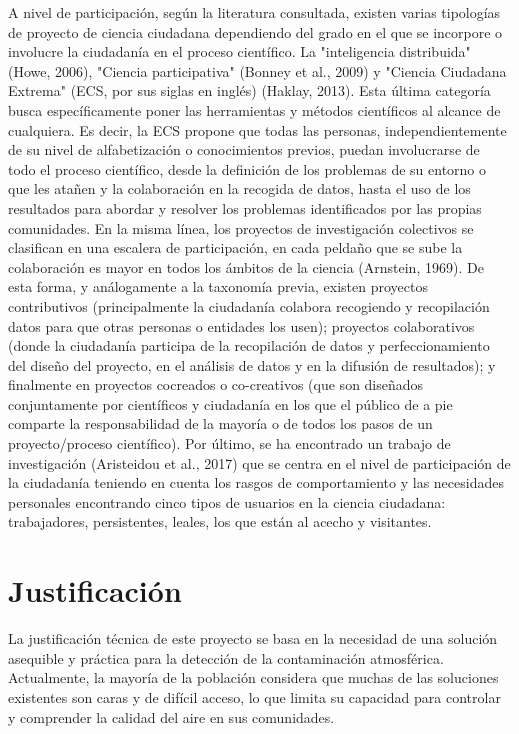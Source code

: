 A nivel de participación, según la literatura consultada, existen varias tipologías de proyecto de ciencia ciudadana dependiendo del grado en el que se incorpore o involucre la ciudadanía en el proceso científico. La "inteligencia distribuida" (Howe, 2006), "Ciencia participativa" (Bonney et al., 2009) y "Ciencia Ciudadana Extrema" (ECS, por sus siglas en inglés) (Haklay, 2013). Esta última categoría busca específicamente poner las herramientas y métodos científicos al alcance de cualquiera. Es decir, la ECS propone que todas las personas, independientemente de su nivel de alfabetización o conocimientos previos, puedan involucrarse de todo el proceso científico, desde la definición de los problemas de su entorno o que les atañen y la colaboración en la recogida de datos, hasta el uso de los resultados para abordar y resolver los problemas identificados por las propias comunidades. En la misma línea, los proyectos de investigación colectivos se clasifican en una escalera de participación, en cada peldaño que se sube la colaboración es mayor en todos los ámbitos de la ciencia (Arnstein, 1969). De esta forma, y análogamente a la taxonomía previa, existen proyectos contributivos (principalmente la ciudadanía colabora recogiendo y recopilación datos para que otras personas o entidades los usen); proyectos colaborativos (donde la ciudadanía participa de la recopilación de datos y perfeccionamiento del diseño del proyecto, en el análisis de datos y en la difusión de resultados); y finalmente en proyectos cocreados o co-creativos (que son diseñados conjuntamente por científicos y ciudadanía en los que el público de a pie comparte la responsabilidad de la mayoría o de todos los pasos de un proyecto/proceso científico). Por último, se ha encontrado un trabajo de investigación (Aristeidou et al., 2017) que se centra en el nivel de participación de la ciudadanía teniendo en cuenta los rasgos de comportamiento y las necesidades personales encontrando cinco tipos de usuarios en la ciencia ciudadana: trabajadores, persistentes, leales, los que están al acecho y visitantes.


\section{Justificación}
La justificación técnica de este proyecto se basa en la necesidad de una solución asequible y práctica para la detección de la contaminación atmosférica. Actualmente, la mayoría de la población considera que muchas de las soluciones existentes son caras y de difícil acceso, lo que limita su capacidad para controlar y comprender la calidad del aire en sus comunidades.

